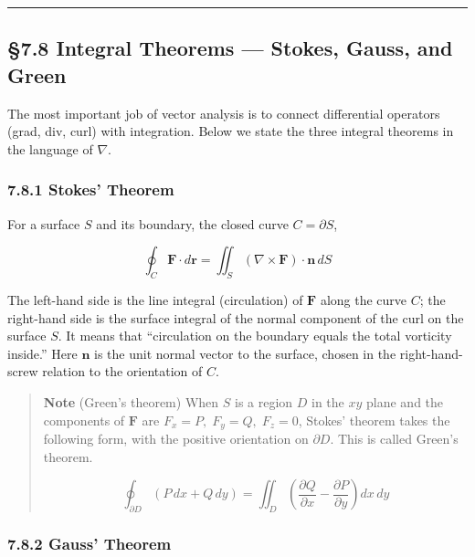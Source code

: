 \begin{center}\rule{0.5\linewidth}{0.5pt}\end{center}

\hypertarget{integral-theorems-stokes-gauss-and-green}{%
\subsection{§7.8 Integral Theorems --- Stokes, Gauss, and
Green}\label{integral-theorems-stokes-gauss-and-green}}

The most important job of vector analysis is to connect differential
operators (grad, div, curl) with integration. Below we state the three
integral theorems in the language of \(\nabla\).

\hypertarget{stokes-theorem}{%
\subsubsection{7.8.1 Stokes' Theorem}\label{stokes-theorem}}

For a surface \(S\) and its boundary, the closed curve
\(C = \partial S\),

\[\oint_C \mathbf{F} \cdot d\mathbf{r} = \iint_S (\nabla \times \mathbf{F}) \cdot \mathbf{n}\,dS\]

The left-hand side is the line integral (circulation) of \(\mathbf{F}\)
along the curve \(C\); the right-hand side is the surface integral of
the normal component of the curl on the surface \(S\). It means that
``circulation on the boundary equals the total vorticity inside.'' Here
\(\mathbf{n}\) is the unit normal vector to the surface, chosen in the
right-hand-screw relation to the orientation of \(C\).

\begin{quote}
\textbf{Note} (Green's theorem) When \(S\) is a region \(D\) in the
\(xy\) plane and the components of \(\mathbf{F}\) are
\(F_x=P,\;F_y=Q,\;F_z=0\), Stokes' theorem takes the following form,
with the positive orientation on \(\partial D\). This is called Green's
theorem.

\[\oint_{\partial D} (P\,dx + Q\,dy) = \iint_D \left(\frac{\partial Q}{\partial x} - \frac{\partial P}{\partial y}\right) dx\,dy\]
\end{quote}

\hypertarget{gauss-theorem-1}{%
\subsubsection{7.8.2 Gauss' Theorem}\label{gauss-theorem-1}}

